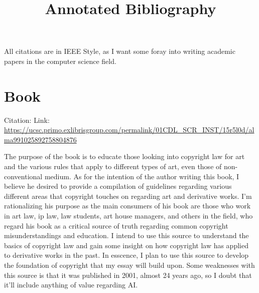 \documentclass{article}
\title{Annotated Bibliography}
\begin{document}
\maketitle

All citations are in IEEE Style, as I want some foray into writing academic papers in
the computer science field.



\section{Book}

Citation: \cite{stokes2021}
Link: \url{https://ucsc.primo.exlibrisgroup.com/permalink/01CDL_SCR_INST/15r5l0d/alma991025892758804876}

The purpose of the book is to educate those looking into copyright law
for art and the various rules that apply to different types of art, even those of non-conventional medium.
As for the intention of the author writing this book, I believe he desired to
provide a compilation of guidelines regarding various different areas that copyright touches on
regarding art and derivative works. I'm rationalizing his purpose as the main consumers
of his book are those who work in art law, ip law, law students, art house managers,
and others in the field, who regard his book as a critical source of truth regarding
common copyright misunderstandings and education. I intend to use this source
to understand the basics of copyright law and gain some insight on how copyright law
has applied to derivative works in the past. In esscence, I plan to use this source to develop
the foundation of copyright that my essay will build upon. Some weaknesses with this source
is that it was published in 2001, almost 24 years ago, so I doubt that it'll include anything of
value regarding AI.
\end{document}
